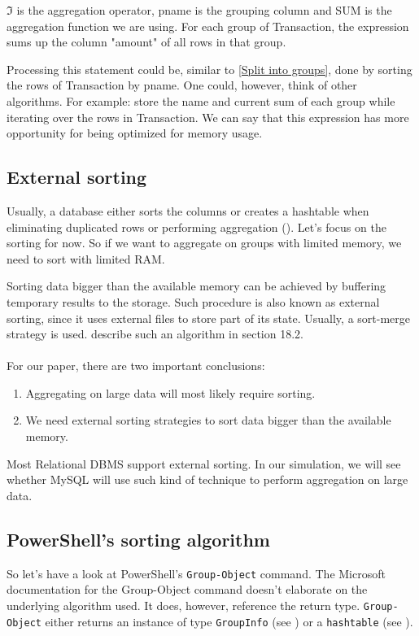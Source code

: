 $\mathfrak{I}$ is the aggregation operator, pname is the grouping column 
and SUM is the aggregation function we are using. For each group of
Transaction, the expression sums up the column "amount"
of all rows in that group.

Processing this statement could be, similar to \ref{Split into groups},
done by sorting the rows of Transaction by pname. One could, however,
think of other algorithms. For example:
store the name and current sum of each group while iterating over
the rows in Transaction. We can say that this expression
has more opportunity for being optimized for memory usage.

\subsection{External sorting} \label{External Sorting}

Usually, a database either sorts the columns or creates a hashtable
when eliminating duplicated rows or performing aggregation (\cite{Edga}).
Let's focus on the sorting for now. So if we want to aggregate on groups
with limited memory, we need to sort with limited RAM.

Sorting data bigger than the available memory can be achieved by buffering
temporary results to the storage. Such procedure is also known as external
sorting, since it uses external files to store part of its state. Usually,
a sort-merge strategy is used. \cite{Elma89} describe such an algorithm
in section 18.2. \\ \\
For our paper, there are two important conclusions:
\begin{enumerate}
    \item Aggregating on large data will most likely require sorting.
    \item We need external sorting strategies to sort data bigger than
the available memory.
\end{enumerate}
Most Relational \gls{DBMS} support external sorting. In our simulation,
we will see whether MySQL will use such kind of technique to perform
aggregation on large data.

\subsection{PowerShell's sorting algorithm}

So let's have a look at PowerShell's \verb+Group-Object+ command.
The Microsoft documentation \cite{docPSGO} for the Group-Object
command doesn't elaborate on the underlying algorithm used.
It does, however, reference the return type.
\verb+Group-Object+ either returns an instance of type
\verb+GroupInfo+ (see \cite{docPSGI})
or a \verb+hashtable+ (see \cite{docPSHT}).

